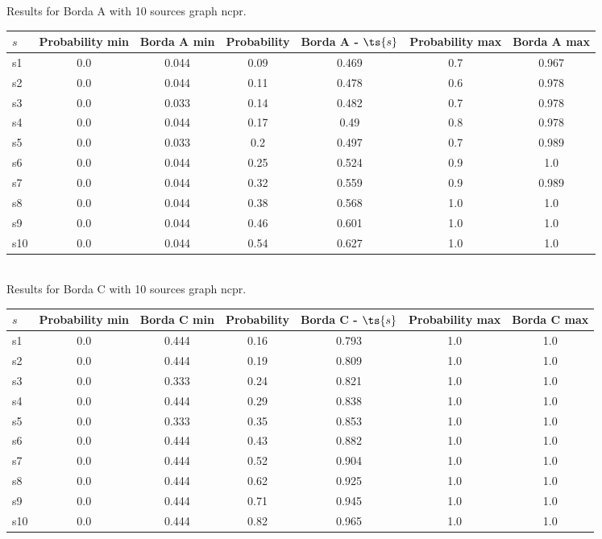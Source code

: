 \documentclass{article}
\begin{document}
\noindent Results for Borda A with 10 sources graph ncpr.

\noindent\begin{tabular}{|l|c|c|c|c|c|c|}
\hline
$s$& Probability min & Borda A min & Probability & Borda A - $\ts{s}$ & Probability max & Borda A max\\
\hline
s1 &0.0 & 0.044 & 0.09 & 0.469 & 0.7 & 0.967\\
\hline
s2 &0.0 & 0.044 & 0.11 & 0.478 & 0.6 & 0.978\\
\hline
s3 &0.0 & 0.033 & 0.14 & 0.482 & 0.7 & 0.978\\
\hline
s4 &0.0 & 0.044 & 0.17 & 0.49 & 0.8 & 0.978\\
\hline
s5 &0.0 & 0.033 & 0.2 & 0.497 & 0.7 & 0.989\\
\hline
s6 &0.0 & 0.044 & 0.25 & 0.524 & 0.9 & 1.0\\
\hline
s7 &0.0 & 0.044 & 0.32 & 0.559 & 0.9 & 0.989\\
\hline
s8 &0.0 & 0.044 & 0.38 & 0.568 & 1.0 & 1.0\\
\hline
s9 &0.0 & 0.044 & 0.46 & 0.601 & 1.0 & 1.0\\
\hline
s10 &0.0 & 0.044 & 0.54 & 0.627 & 1.0 & 1.0\\
\hline
\end{tabular}\\

\noindent Results for Borda C with 10 sources graph ncpr.

\noindent\begin{tabular}{|l|c|c|c|c|c|c|}
\hline
$s$& Probability min & Borda C min & Probability & Borda C - $\ts{s}$ & Probability max & Borda C max\\
\hline
s1 &0.0 & 0.444 & 0.16 & 0.793 & 1.0 & 1.0\\
\hline
s2 &0.0 & 0.444 & 0.19 & 0.809 & 1.0 & 1.0\\
\hline
s3 &0.0 & 0.333 & 0.24 & 0.821 & 1.0 & 1.0\\
\hline
s4 &0.0 & 0.444 & 0.29 & 0.838 & 1.0 & 1.0\\
\hline
s5 &0.0 & 0.333 & 0.35 & 0.853 & 1.0 & 1.0\\
\hline
s6 &0.0 & 0.444 & 0.43 & 0.882 & 1.0 & 1.0\\
\hline
s7 &0.0 & 0.444 & 0.52 & 0.904 & 1.0 & 1.0\\
\hline
s8 &0.0 & 0.444 & 0.62 & 0.925 & 1.0 & 1.0\\
\hline
s9 &0.0 & 0.444 & 0.71 & 0.945 & 1.0 & 1.0\\
\hline
s10 &0.0 & 0.444 & 0.82 & 0.965 & 1.0 & 1.0\\
\hline
\end{tabular}\\
\end{document}
